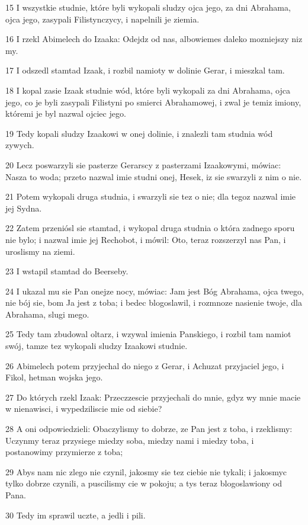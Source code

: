 \par 15 I wszystkie studnie, które byli wykopali sludzy ojca jego, za dni Abrahama, ojca jego, zasypali Filistynczycy, i napelnili je ziemia.
\par 16 I rzekl Abimelech do Izaaka: Odejdz od nas, albowiemes daleko mozniejszy niz my.
\par 17 I odszedl stamtad Izaak, i rozbil namioty w dolinie Gerar, i mieszkal tam.
\par 18 I kopal zasie Izaak studnie wód, które byli wykopali za dni Abrahama, ojca jego, co je byli zasypali Filistyni po smierci Abrahamowej, i zwal je temiz imiony, któremi je byl nazwal ojciec jego.
\par 19 Tedy kopali sludzy Izaakowi w onej dolinie, i znalezli tam studnia wód zywych.
\par 20 Lecz poswarzyli sie pasterze Gerarscy z pasterzami Izaakowymi, mówiac: Nasza to woda; przeto nazwal imie studni onej, Hesek, iz sie swarzyli z nim o nie.
\par 21 Potem wykopali druga studnia, i swarzyli sie tez o nie; dla tegoz nazwal imie jej Sydna.
\par 22 Zatem przeniósl sie stamtad, i wykopal druga studnia o która zadnego sporu nie bylo; i nazwal imie jej Rechobot, i mówil: Oto, teraz rozszerzyl nas Pan, i uroslismy na ziemi.
\par 23 I wstapil stamtad do Beerseby.
\par 24 I ukazal mu sie Pan onejze nocy, mówiac: Jam jest Bóg Abrahama, ojca twego, nie bój sie, bom Ja jest z toba; i bedec blogoslawil, i rozmnoze nasienie twoje, dla Abrahama, slugi mego.
\par 25 Tedy tam zbudowal oltarz, i wzywal imienia Panskiego, i rozbil tam namiot swój, tamze tez wykopali sludzy Izaakowi studnie.
\par 26 Abimelech potem przyjechal do niego z Gerar, i Achuzat przyjaciel jego, i Fikol, hetman wojska jego.
\par 27 Do których rzekl Izaak: Przeczzescie przyjechali do mnie, gdyz wy mnie macie w nienawisci, i wypedziliscie mie od siebie?
\par 28 A oni odpowiedzieli: Obaczylismy to dobrze, ze Pan jest z toba, i rzeklismy: Uczynmy teraz przysiege miedzy soba, miedzy nami i miedzy toba, i postanowimy przymierze z toba;
\par 29 Abys nam nic zlego nie czynil, jakosmy sie tez ciebie nie tykali; i jakosmyc tylko dobrze czynili, a puscilismy cie w pokoju; a tys teraz blogoslawiony od Pana.
\par 30 Tedy im sprawil uczte, a jedli i pili.
